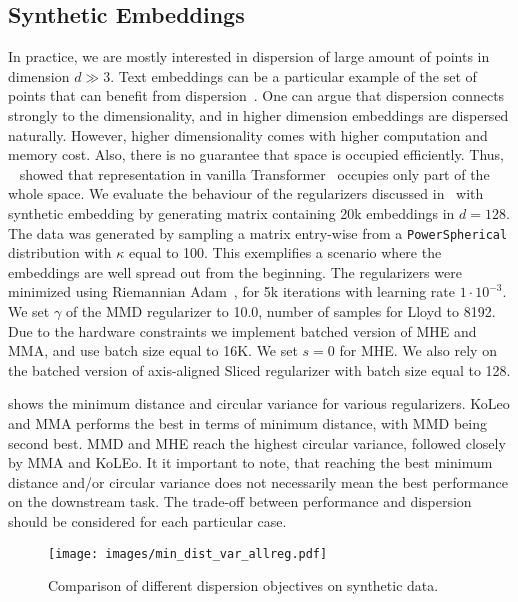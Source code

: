 \documentclass[10pt]{article} %
\begin{document}
\subsection{Synthetic Embeddings}
In practice, we are mostly interested in dispersion of large amount of points in dimension $d\gg3$. Text embeddings can be a particular example of the set of points that can benefit from dispersion~\citep{tokarchuk-niculae-2024-unreasonable}. One can argue that dispersion connects strongly to the dimensionality, and in higher dimension embeddings are dispersed naturally. However, higher dimensionality comes with higher computation and memory cost. Also, there is no guarantee that space is occupied efficiently. Thus, ~\cite{gao2018representation} showed that representation in vanilla Transformer~\cite{Vaswani-trafo} occupies only part of the whole space. We evaluate the behaviour of the regularizers discussed in~ with synthetic embedding by generating matrix containing 20k embeddings in $d=128$. The data was generated by sampling a matrix entry-wise from a \texttt{PowerSpherical}\citep{decao2020power} distribution with $\kappa$ equal to 100. This exemplifies a scenario where the embeddings are well spread out from the beginning. The regularizers were minimized using Riemannian Adam~\citep{kingma_adam, becigneul2018riemannian, geoopt2020kochurov}, for 5k iterations with learning rate \(1 \cdot 10^{-3}\). We set $\gamma$ of the MMD regularizer to 10.0, number of samples for Lloyd to 8192. Due to the hardware constraints we implement batched version of MHE and MMA, and use batch size equal to 16K. We set $s=0$ for MHE. We also rely on the batched version of axis-aligned Sliced regularizer with batch size equal to 128. 


 shows the minimum distance and circular variance for various regularizers. KoLeo and MMA performs the best in terms of minimum distance, with MMD being second best. MMD and MHE reach the highest circular variance, followed closely by MMA and KoLEo. It it important to note, that reaching the best minimum distance and/or circular variance does not necessarily mean the best performance on the downstream task. The trade-off between performance and dispersion should be considered for each particular case.

\begin{figure}[t]
    \centering
    \texttt{[image: images/min\_dist\_var\_allreg.pdf]}
    \caption{Comparison of different dispersion objectives on synthetic data.}
    \label{fig:compare-regs}
\end{figure}
\end{document}
